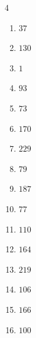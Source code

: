 \begin{multicols}{4}
\begin{enumerate}
  \item $37$


  \item $130$


  \item $1$


  \item $93$


  \item $73$


  \item $170$


  \item $229$


  \item $79$


  \item $187$


  \item $77$


  \item $110$


  \item $164$


  \item $219$


  \item $106$


  \item $166$


\columnbreak %

  \item $100$


\end{enumerate}
\end{multicols}
